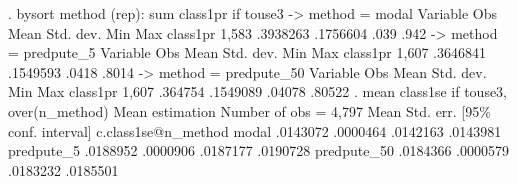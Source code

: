 . bysort method (rep): sum class1pr if touse3
{\smallskip}
-> method = modal
{\smallskip}
    Variable {\VBAR}        Obs        Mean    Std. dev.       Min        Max
    class1pr {\VBAR}      1,583    .3938263    .1756604       .039       .942
{\smallskip}
-> method = predpute_5
{\smallskip}
    Variable {\VBAR}        Obs        Mean    Std. dev.       Min        Max
    class1pr {\VBAR}      1,607    .3646841    .1549593      .0418      .8014
{\smallskip}
-> method = predpute_50
{\smallskip}
    Variable {\VBAR}        Obs        Mean    Std. dev.       Min        Max
    class1pr {\VBAR}      1,607     .364754    .1549089     .04078     .80522
{\smallskip}
{\smallskip}
. mean class1se if touse3, over(n_method)
{\smallskip}
Mean estimation                                 Number of obs = 4,797
{\smallskip}
                    {\VBAR}       Mean   Std. err.     [95\% conf. interval]
c.class1se@n_method {\VBAR}
             modal  {\VBAR}   .0143072   .0000464      .0142163    .0143981
        predpute_5  {\VBAR}   .0188952   .0000906      .0187177    .0190728
       predpute_50  {\VBAR}   .0184366   .0000579      .0183232    .0185501
